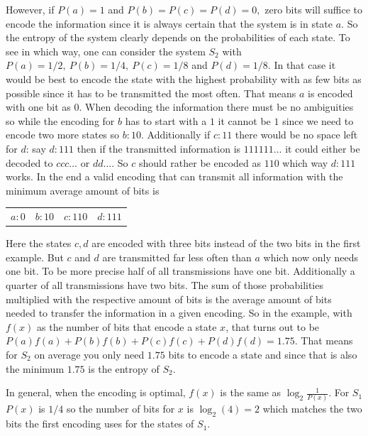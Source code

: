 However, if $P(a)=1$ and $P(b)=P(c)=P(d)=0,$ zero bits will suffice to encode the information since
it is always certain that the system is in state $a$. So the entropy of the system clearly depends on
the probabilities of each state. To see in which way, one can consider the system $S_2$ with 
$P(a)=1/2,\ P(b)=1/4,\ P(c)=1/8$ and $P(d)=1/8$. In that case it would be best to encode the state
with the highest probability with as few bits as possible since it has to be transmitted the most
often. That means $a$ is encoded with one bit as $0$. When decoding the information there must be
no ambiguities so while the encoding for $b$ has to start with a $1$ it cannot be $1$ since we need 
to encode two more states so $b: 10$. Additionally if $c: 11$ there would be no space left for $d$:
say $d: 111$ then if the transmitted information is $111111\dots$ it could either be decoded to
$ccc\dots$ or $dd\dots$. So $c$ should rather be encoded as $110$ which way $d: 111$ works. In the end a valid
encoding that can transmit all information with the minimum average amount of bits is

\begin{center}
    \begin{tabular} {c c c c}
        $a: 0$ & $b: 10$ & $c: 110$ & $d: 111$
    \end{tabular}
\end{center}

Here the states $c, d$ are encoded with three bits instead of the two bits in the first example.
But $c$ and $d$ are transmitted far less often than $a$ which now only needs one bit. To be more precise
half of all transmissions have one bit. Additionally a quarter of all transmissions have two bits. 
The sum of those probabilities multiplied with the respective amount of bits is the average amount of bits
needed to transfer the information in a given encoding. So in the example, with $f(x)$ as the number of
bits that encode a state $x$, that turns out to be $P(a)f(a)+P(b)f(b)+P(c)f(c)+P(d)f(d)=1.75$.
That means for $S_2$ on average you only need $1.75$ bits to encode a state and since that is also the
minimum $1.75$ is the entropy of $S_2$.

In general, when the encoding is optimal, $f(x)$ is the same as $\log_{2} \frac{1}{P(x)}$. For $S_1$ $P(x)$ is $1/4$
so the number of bits for $x$ is $\log_{2} (4)=2$ which matches the two bits the first encoding uses 
for the states of $S_1$.

